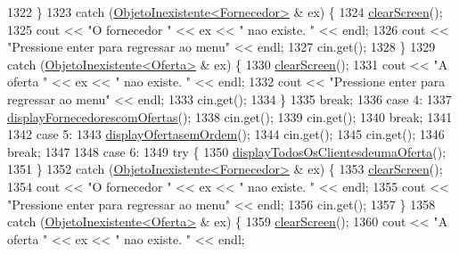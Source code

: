 \begin{DoxyCode}
1322             \}
1323             \textcolor{keywordflow}{catch} (\hyperlink{classObjetoInexistente}{ObjetoInexistente<Fornecedor>} & ex) \{
1324                 \hyperlink{menu_8h_aceb70c1ed7e11f0863a868704f02214b}{clearScreen}();
1325                 cout << \textcolor{stringliteral}{"O fornecedor "} << ex << \textcolor{stringliteral}{" nao existe. "} << endl;
1326                 cout << \textcolor{stringliteral}{"Pressione enter para regressar ao menu"} << endl;
1327                 cin.get();
1328             \}
1329             \textcolor{keywordflow}{catch} (\hyperlink{classObjetoInexistente}{ObjetoInexistente<Oferta>} & ex) \{
1330                 \hyperlink{menu_8h_aceb70c1ed7e11f0863a868704f02214b}{clearScreen}();
1331                 cout << \textcolor{stringliteral}{"A oferta "} << ex << \textcolor{stringliteral}{" nao existe. "} << endl;
1332                 cout << \textcolor{stringliteral}{"Pressione enter para regressar ao menu"} << endl;
1333                 cin.get();
1334             \}
1335             \textcolor{keywordflow}{break};
1336         \textcolor{keywordflow}{case} 4:
1337             \hyperlink{classEmpresa_aa47e9a64800a41180b7f374b73a1f32b}{displayFornecedorescomOfertas}();
1338             cin.get();
1339             cin.get();
1340             \textcolor{keywordflow}{break};
1341 
1342         \textcolor{keywordflow}{case} 5:
1343             \hyperlink{classEmpresa_acd458614a3cca3f432b54212a2e72584}{displayOfertasemOrdem}();
1344             cin.get();
1345             cin.get();
1346             \textcolor{keywordflow}{break};
1347 
1348         \textcolor{keywordflow}{case} 6:
1349             \textcolor{keywordflow}{try} \{
1350                 \hyperlink{classEmpresa_a641c2eb827b39ab79919187645ff71a9}{displayTodosOsClientesdeumaOferta}();
1351             \}
1352             \textcolor{keywordflow}{catch} (\hyperlink{classObjetoInexistente}{ObjetoInexistente<Fornecedor>} & ex) \{
1353                 \hyperlink{menu_8h_aceb70c1ed7e11f0863a868704f02214b}{clearScreen}();
1354                 cout << \textcolor{stringliteral}{"O fornecedor "} << ex << \textcolor{stringliteral}{" nao existe. "} << endl;
1355                 cout << \textcolor{stringliteral}{"Pressione enter para regressar ao menu"} << endl;
1356                 cin.get();
1357             \}
1358             \textcolor{keywordflow}{catch} (\hyperlink{classObjetoInexistente}{ObjetoInexistente<Oferta>} & ex) \{
1359                 \hyperlink{menu_8h_aceb70c1ed7e11f0863a868704f02214b}{clearScreen}();
1360                 cout << \textcolor{stringliteral}{"A oferta "} << ex << \textcolor{stringliteral}{" nao existe. "} << endl;

\end{DoxyCode}
